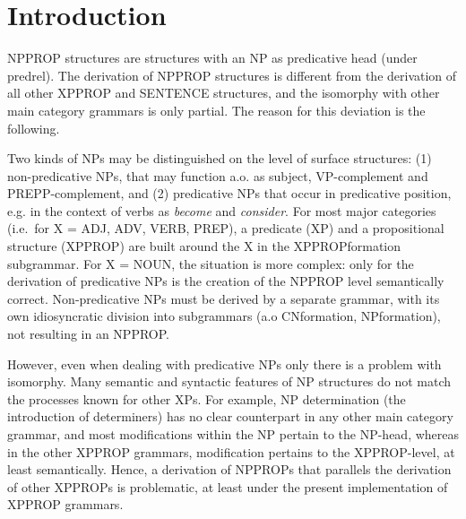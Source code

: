 
   \RosSupersedes{-}
   \MakeRosTitle
%
%

\section{Introduction}
NPPROP structures are structures with an NP as predicative head (under predrel).
The derivation of NPPROP structures is different from the derivation of all
other XPPROP and SENTENCE structures, and the isomorphy with other 
main category grammars is only partial. 
The reason for this deviation is the following.

Two kinds  of NPs may be distinguished on the level of
surface structures: (1) non-predicative NPs, 
that may function a.o. as subject, VP-complement and PREPP-complement, and 
(2) predicative NPs that occur in predicative position, e.g. in the context 
of verbs as {\em become\/} and {\em consider\/}. 
For most major categories (i.e.\ for X = ADJ, ADV, VERB, PREP), 
a predicate (XP) and a propositional structure (XPPROP) are built around the 
X in the XPPROPformation subgrammar. For X = NOUN, the situation is more 
complex: only for the derivation of predicative NPs is the 
creation of the NPPROP level semantically correct. 
Non-predicative NPs must be derived by a separate grammar, with its own 
idiosyncratic division into subgrammars (a.o CNformation, NPformation), not 
resulting in an NPPROP.

However, even when dealing with predicative NPs only there is a problem with 
isomorphy.
Many semantic and syntactic features of NP structures do not match the 
processes known for other XPs.
For example, NP determination (the introduction of determiners) has no clear
counterpart in any other main category grammar, and most 
modifications within the NP pertain to the NP-head, whereas in the  
other XPPROP grammars, modification pertains to the XPPROP-level, at 
least semantically. Hence, a derivation of 
NPPROPs that parallels the derivation of other XPPROPs is 
problematic, at least under the present implementation of XPPROP grammars.

